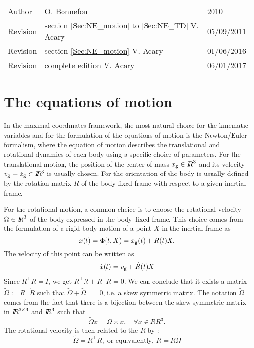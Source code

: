 


\begin{tabular}{lll}
  \centering
  Author &  O. Bonnefon &2010\\
  Revision& section \ref{Sec:NE_motion} to \ref{Sec:NE_TD} V. Acary&  05/09/2011\\
  Revision& section \ref{Sec:NE_motion}  V. Acary&  01/06/2016\\
  Revision& complete edition V. Acary&  06/01/2017\\

\end{tabular}


\section{The equations of motion}


\def\cg{\sf \small g}
In the maximal coordinates framework, the most natural choice for the kinematic  variables and for the formulation of the equations of motion is the Newton/Euler formalism, where the equation of motion describes the translational and rotational dynamics of each body using a specific choice of parameters. For the translational motion, the position of the center of mass $x_{\cg}\in \RR^3$ and its velocity  $v_{\cg} = \dot x_{\cg} \in \RR^3$ is usually chosen. For the orientation of the body is usually defined by the rotation matrix $R$ of the body-fixed frame with respect to a given inertial frame.

For the rotational motion, a common choice is to choose the rotational velocity  $\Omega \in \mbox{\rm $I\!\!R$}^3$ of the body expressed in the body--fixed frame. This choice comes from the formulation of a rigid body motion of a point $X$ in the inertial frame as
\begin{equation}
  \label{eq:28}
  x(t) = \Phi(t,X) = x_{\cg}(t) + R(t) X.
\end{equation}
The velocity of this point can be written as
\begin{equation}
  \label{eq:29}
  \dot x(t) = v_{\cg} + \dot R(t) X
\end{equation}
Since $R^\top R=I$, we get $R^\top \dot R + \dot R^\top R =0$. We can conclude that it exists a matrix $\tilde \Omega := R^\top \dot R $ such that $\tilde \Omega + \tilde \Omega^\top=0$, i.e. a skew symmetric matrix. The notation $\tilde \Omega$ comes from the fact that there is a bijection between the skew symmetric matrix in $\mbox{\rm $I\!\!R$}^{3\times3}$ and $\mbox{\rm $I\!\!R$}^3$ such that
\begin{equation}
  \label{eq:30}
  \tilde \Omega x  = \Omega \times x, \quad \forall x\in RR^3.
\end{equation}
The rotational velocity is then related to the $R$ by :
\begin{equation}
  \label{eq:angularvelocity}
  \widetilde \Omega = R^\top \dot R, \text { or equivalently, } \dot R  = R \widetilde \Omega
\end{equation}



